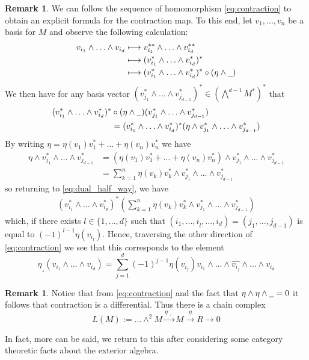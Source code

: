 \documentclass[12pt]{article}
\theoremstyle{plain}
\theoremstyle{definition}
\newtheorem{remark}[thm]{Remark}
\newcommand{\und}[1]{\underline{\hspace{#1 cm}}}
\newcommand{\lto}{\longrightarrow}
\begin{document}
\begin{remark}
	We can follow the sequence of homomorphism \eqref{eq:contraction} to obtain an explicit formula for the contraction map. To this end, let $v_1,...,v_n$ be a basis for $M$ and observe the following calculation:
	\begin{align*}
		v_{i_1} \wedge \hdots \wedge v_{i_d} &\longmapsto v_{i_1}^{\ast\ast} \wedge \hdots \wedge v_{i_d}^{\ast\ast}\\
		&\longmapsto (v_{i_1}^\ast \wedge \hdots \wedge v_{i_d}^\ast)^\ast\\
		&\longmapsto (v_{i_1}^\ast \wedge \hdots \wedge v_{i_d}^\ast)^\ast\circ(\eta \wedge \und{0.2})
	\end{align*}
	We then have for any basis vector $(v_{j_1}^\ast \wedge \hdots \wedge v_{j_{d-1}}^\ast)^\ast \in (\bigwedge^{d-1}M^\ast)^\ast$ that
	\begin{align}
		(v_{i_1}^\ast \wedge \hdots \wedge v_{i_d}^\ast)^\ast&\circ(\eta \wedge \und{0.2})(v_{j_1}^\ast \wedge \hdots \wedge v_{j_{d-1}}^\ast)\\
		\label{eq:dual_half_way}&= (v_{i_1}^\ast \wedge \hdots \wedge v_{i_d}^\ast)^\ast(\eta \wedge v_{j_1}^\ast \wedge \hdots \wedge v_{j_{d-1}}^\ast)
	\end{align}
	By writing $\eta = \eta(v_1)v_1^\ast + \hdots + \eta(v_n)v_n^\ast$ we have
	\begin{align*}
		\eta \wedge v_{j_1}^\ast \wedge \hdots \wedge v_{j_{d-1}}^\ast &= (\eta(v_1)v_1^\ast+ \hdots + \eta(v_n)v_n^\ast)\wedge v_{j_1}^\ast \wedge \hdots \wedge v_{j_{d-1}}^\ast\\
		&= \sum_{k = 1}^n \eta(v_k)v_k^\ast \wedge v_{j_1}^\ast \wedge \hdots \wedge v_{j_{d-1}}^\ast
	\end{align*}
	so returning to \eqref{eq:dual_half_way}, we have
	\begin{align*}
		(v_{i_1}^\ast \wedge \hdots \wedge v_{i_d}^\ast)^\ast(\sum_{k = 1}^n \eta(v_k)v_k^\ast \wedge v_{j_1}^\ast \wedge \hdots \wedge v_{j_{d-1}}^\ast)
	\end{align*}
	which, if there exists $l \in \lbrace 1,...,d\rbrace$ such that $(i_1,...,i_{\hat{l}},...,i_d) = (j_1,...,j_{d-1})$ is equal to $(-1)^{l-1}\eta(v_{i_l})$. Hence, traversing the other direction of \eqref{eq:contraction} we see that this corresponds to the element
	\begin{equation}
		\eta_{\lrcorner}(v_{i_1} \wedge \hdots \wedge v_{i_d}) = \sum_{j = 1}^d(-1)^{j-1} \eta(v_{i_j}) v_{i_1} \wedge \hdots \wedge \hat{v_{i_j}} \wedge \hdots \wedge v_{i_d}
	\end{equation}
\end{remark}
\begin{remark}\label{rmk:contraction_differential}
	Notice that from \eqref{eq:contraction} and the fact that $\eta \wedge \eta \wedge \und{0.2} = 0$ it follows that contraction is a differential. Thus there is a chain complex
	\begin{equation}
		L(M) := \hdots \wedge^2 M \stackrel{\eta\lrcorner}{\lto} M \stackrel{\eta}{\lto} R \lto 0
	\end{equation}
\end{remark}
In fact, more can be said, we return to this after considering some category theoretic facts about the exterior algebra.
\end{document}
